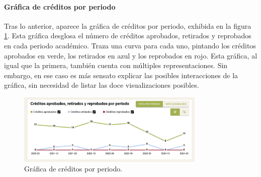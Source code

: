 \paragraph{Gráfica de créditos por periodo} Tras lo anterior, aparece la gráfica de créditos por periodo, exhibida en la figura \ref{fig:grafica_creditos}. Esta gráfica desglosa el número de créditos aprobados, retirados y reprobados en cada periodo académico. Traza una curva para cada uno, pintando los créditos aprobados en verde, los retirados en azul y los reprobados en rojo. Esta gráfica, al igual que la primera, también cuenta con múltiples representaciones. Sin embargo, en ese caso es más sensato explicar las posibles interacciones de la gráfica, sin necesidad de listar las doce visualizaciones posibles.

\begin{figure}[H]
  \centering
  \includegraphics[width=0.8\textwidth]{img/nes/grafica_creditos.png}
  \caption{Gráfica de créditos por periodo.}
  \label{fig:grafica_creditos}
\end{figure}

